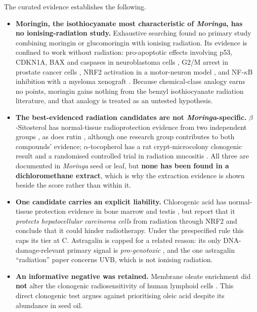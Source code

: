 The curated evidence establishes the following.
\begin{itemize}
  \item \textbf{Moringin, the isothiocyanate most characteristic of \textit{Moringa}, has no
    ionising-radiation study.} Exhaustive searching found no primary study combining
    moringin or glucomoringin with ionising radiation. Its evidence is confined to work
    without radiation: pro-apoptotic effects involving p53, CDKN1A, BAX and caspases in
    neuroblastoma cells \parencite{cirmi2019}, G2/M arrest in prostate cancer cells
    \parencite{abdkarim2023}, NRF2 activation in a motor-neuron model
    \parencite{gugliandolo2024}, and NF-$\kappa$B inhibition with a myeloma xenograft
    \parencite{brunelli2010}. Because chemical-class analogy earns no points, moringin gains
    nothing from the benzyl isothiocyanate radiation literature, and that analogy is
    treated as an untested hypothesis.
  \item \textbf{The best-evidenced radiation candidates are not \textit{Moringa}-specific.}
    $\beta$-Sitosterol has normal-tissue radioprotection evidence from two independent
    groups \parencite{li2007,elbakary2026}, as does rutin \parencite{patil2017,thabet2018},
    although one research group contributes to both compounds' evidence;
    $\alpha$-tocopherol has a rat crypt-microcolony clonogenic result
    \parencite{felemovicius1995} and a randomised controlled trial in radiation mucositis
    \parencite{ferreira2004}. All three are documented in \textit{Moringa} seed or leaf, but
    \textbf{none has been found in a dichloromethane extract}, which is why the extraction
    evidence is shown beside the score rather than within it.
  \item \textbf{One candidate carries an explicit liability.} Chlorogenic acid has
    normal-tissue protection evidence in bone marrow \parencite{abraham1993} and testis
    \parencite{abedpour2022}, but \textcite{yin2022} report that it \emph{protects
    hepatocellular carcinoma cells} from radiation through NRF2 and conclude that it could
    hinder radiotherapy. Under the prespecified rule this caps its tier at C. Astragalin is
    capped for a related reason: its only DNA-damage-relevant primary signal is
    \emph{pro-genotoxic} \parencite{saito2012}, and the one astragalin \enquote{radiation}
    paper concerns UVB, which is not ionising radiation.
  \item \textbf{An informative negative was retained.} Membrane oleate enrichment did
    \textbf{not} alter the clonogenic radiosensitivity of human lymphoid cells
    \parencite{george1983}. This direct clonogenic test argues against prioritising oleic
    acid despite its abundance in seed oil.
\end{itemize}

